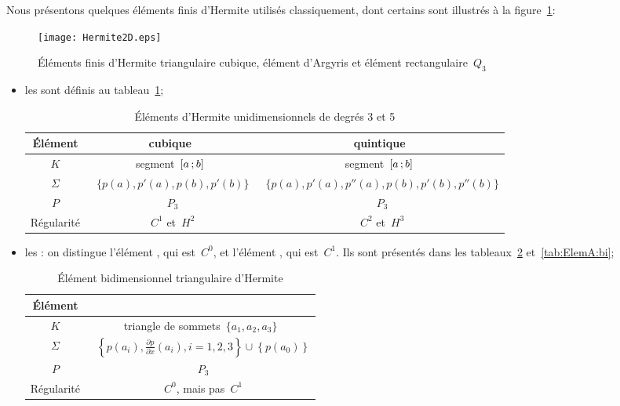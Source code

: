 Nous présentons quelques éléments finis d'Hermite utilisés classiquement, dont certains sont illustrés à la figure~\ref{Hermite2D}:
\begin{figure}[h!]
\centering
\texttt{[image: Hermite2D.eps]}
\caption{Éléments finis d'Hermite triangulaire cubique, élément d'Argyris et élément rectangulaire~$Q_3$}\label{Hermite2D}
\end{figure}
\begin{itemize}
\item les  sont définis au tableau~\ref{tab:ElemH:uni};
\begin{table}[h!]\centering\small
\begin{tabular}{c|cc}
Élément & cubique & quintique\\
\hline
$K$	  & segment~$\mathopen{[}a\,;b\mathclose{]}$ & segment~$\mathopen{[}a\,;b\mathclose{]}$\\
$\Sigma$ &~$\{p(a), p'(a), p(b), p'(b)\}$ &~$\{p(a), p'(a), p''(a), p(b), p'(b), p''(b)\}$\\
$P$   &~$P_3$ &~$P_3$\\
Régularité &~$C^1$ et~$H^2$ &~$C^2$ et~$H^3$\\
\hline
\end{tabular}
\caption{Éléments d'Hermite unidimensionnels de degrés 3 et 5}\label{tab:ElemH:uni}
\end{table}
\item les :
	on distingue l'élément , qui est~$C^0$, et
  l'élément , qui est~$C^1$.
	Ils sont présentés dans les tableaux~\ref{tab:ElemH:bi} et~\ref{tab:ElemA:bi};
\begin{table}[h!]\centering\small
\begin{tabular}{c|c}
Élément &\\
\hline
$K$	  & triangle de sommets~$\{a_1, a_2, a_3\}$\\
$\Sigma$ &~$\left\{p(a_i), \frac{\partial p}{\partial x}(a_i), i=1, 2, 3\right\} \cup\left\{p(a_0)\right\}$\\
$P$   &~$P_3$\\
Régularité &~$C^0$, mais pas~$C^1$\\
\hline
\end{tabular}\caption{Élément bidimensionnel triangulaire d'Hermite}\label{tab:ElemH:bi}
\end{table}
\begin{table}[h!]\centering\small
\begin{tabular}{c|cc}

\end{tabular}
\end{table}
\end{itemize}
